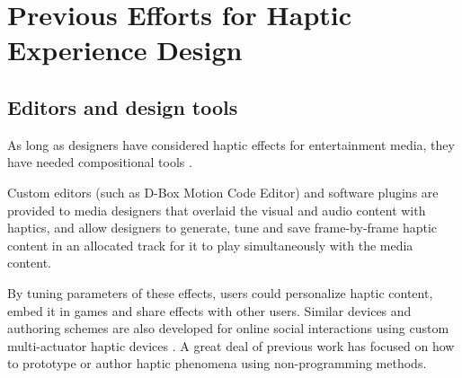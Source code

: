 


%
%
\section{Previous Efforts for Haptic Experience Design}

\subsection{Editors and design tools}
As long as designers have considered haptic effects for entertainment media, they have needed compositional tools %
\cite{Gunther2002}.

Custom editors (such as D-Box Motion Code Editor) and software plugins are provided to media designers that overlaid the visual and audio content with haptics, and allow designers to generate, tune and save frame-by-frame haptic content in an allocated track for it to play simultaneously with the media content. 

By tuning parameters of these effects, users could personalize  haptic content, embed it in games and share effects with other users.
Similar devices and authoring schemes are also developed for online social interactions using custom multi-actuator haptic devices \cite{Kim2009,Tsetserukou2009,Paneels2013}.%
A great deal of previous work has focused on how to prototype or author haptic phenomena using non-programming methods. 

